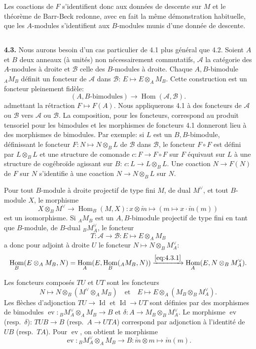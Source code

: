 \documentclass[12pt,a4paper]{article}
\theoremstyle{plain}
\theoremstyle{definition}
\theoremstyle{remark}
\DeclareMathOperator{\Hom}{Hom}
\DeclareMathOperator{\Id}{Id}
\DeclareMathOperator{\ev}{ev}
\begin{document}
Les coactions de $F$ s'identifient donc aux données de descente sur $M$ et le théorème de Barr-Beck redonne, avec en fait la même démonstration habituelle, que les $A$-modules s'identifient aux $B$-modules munis d'une donnée de descente.

\subsection{}

\textbf{4.3.} Nous aurons besoin d'un cas particulier de 4.1 plus général que 4.2. Soient $A$ et $B$ deux anneaux (à unités) non nécessairement commutatifs, $\mathcal{A}$ la catégorie des $A$-modules à droite et $\mathcal{B}$ celle des $B$-modules à droite. Chaque $A,B$-bimodule $_A M_B$ définit un foncteur de $\mathcal{A}$ dans $\mathcal{B}$: $E \mapsto E \otimes_A M_B$. Cette construction est un foncteur pleinement fidèle:
\[
(A,B\text{-bimodules}) \longrightarrow \Hom(\mathcal{A}, \mathcal{B}).
\]
admettant la rétraction $F \mapsto F(A)$. Nous appliquerons 4.1 à des foncteurs de $\mathcal{A}$ ou $\mathcal{B}$ vers $\mathcal{A}$ ou $\mathcal{B}$. La composition, pour les foncteurs, correspond au produit tensoriel pour les bimodules et les morphismes de foncteurs 4.1 donneront lieu à des morphismes de bimodules. Par exemple: si $L$ est un $B,B$-bimodule, définissant le foncteur $F : N \mapsto N \otimes_B L$ de $\mathcal{B}$ dans $\mathcal{B}$, le foncteur $F \circ F$ est défini par $L \otimes_B L$ et une structure de comonade $c : F \to F \circ F$ sur $F$ équivaut sur $L$ à une structure de cogébroïde agissant sur $B$: $c : L \to L \otimes_B L$. Une coaction $N \to F(N)$ de $F$ sur $N$ s'identifie à une coaction $N \to N \otimes_B L$ sur $N$.

Pour tout $B$-module à droite projectif de type fini $M$, de dual $M^\vee$, et tout $B$-module $X$, le morphisme
\begin{equation}\label{eq:4.3.1}
X \otimes_B M^\vee \to \Hom_B(M,X) : x \otimes \check{m} \mapsto (m \mapsto x \cdot \check{m}(m))
\end{equation}
est un isomorphisme. Si $_A M_B$ est un $A,B$-bimodule projectif de type fini en tant que $B$-module, de $B$-dual $_B M_A^\vee$, le foncteur
\[
T : \mathcal{A} \to \mathcal{B} : E \mapsto E \otimes_A M_B
\]
a donc pour adjoint à droite $U$ le foncteur $N \mapsto N \otimes_B M_A^\vee$:
\[
\Hom_B(E \otimes_A M_B, N) = \Hom_A(E, \Hom_B(_A M_B, N)) \xrightarrow{\eqref{eq:4.3.1}} \Hom_A(E, N \otimes_B M_A^\vee).
\]

Les foncteurs composés $TU$ et $UT$ sont les foncteurs
\[
N \mapsto N \otimes_B (M^\vee \otimes_A M_B) \quad \text{et} \quad E \mapsto E \otimes_A (M_B \otimes_B M^\vee_A).
\]
Les flèches d'adjonction $TU \to \Id$ et $\Id \to UT$ sont définies par des morphismes de bimodules $\ev : {}_B M_A^\vee \otimes_A M_B \to B$ et $\delta : A \to M_B \otimes_B M_A^\vee$. Le morphisme $\ev$ (resp.~$\delta$): $TU B \to B$ (resp.~$A \to UT A$) correspond par adjonction à l'identité de $UB$ (resp.~$TA$). Pour $\ev$, on obtient le morphisme
\[
\ev : {}_B M_A^\vee \otimes_A M_B \to B : \check{m} \otimes m \mapsto \check{m}(m).
\]
\end{document}
